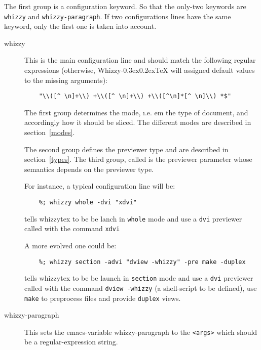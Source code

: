 \documentclass{article}
\let \lst \verb
\def \whizzy{{Whizzy\kern -0.3ex\raise 0.2ex\hbox{\TeX}}}
\begin{document}
The first group is a configuration keyword. 
So that the only-two  keywords are \lst"whizzy" and 
\lst"whizzy-paragraph". If two configurations
lines have the same keyword, only the first one is taken into
account.
\begin{description}
\item[whizzy]
This is the main configuration line and should match the following regular
expressions (otherwise, {\whizzy} will assigned default values to the
missing arguments): 
\begin{verbatim}
    "\\([^ \n]+\\) +\\([^ \n]+\\) +\\([^\n]*[^ \n]\\) *$"
\end{verbatim}
The first group determines the mode, {\i.e. em} the type of document, and
accordingly how it should be sliced.  The different modes are described in
section~\ref {modes}.

The second group defines the previewer type and are described in
section~\ref{types}.  The third group, called is the previewer parameter
whose semantics depends on the previewer type.

For instance, a typical configuration line will be:
\begin{verbatim}
    %; whizzy whole -dvi "xdvi"
\end{verbatim}
tells whizzytex to be be lanch in \lst"whole" mode and use a \lst"dvi"
previewer called with the command \lst"xdvi"

A more evolved one could be:
\begin{verbatim}
    %; whizzy section -advi "dview -whizzy" -pre make -duplex
\end{verbatim}
tells whizzytex to be be launch in \lst"section" mode and use a \lst"dvi"
previewer called with the command \lst"dview -whizzy" (a shell-script to be defined), use \lst"make" to
preprocess files and provide \lst"duplex" views.

\item[whizzy-paragraph]
This sets the emacs-variable whizzy-paragraph to the \lst"<args>"
which should be a regular-expression string. 
\end{description} 


\end{document}
